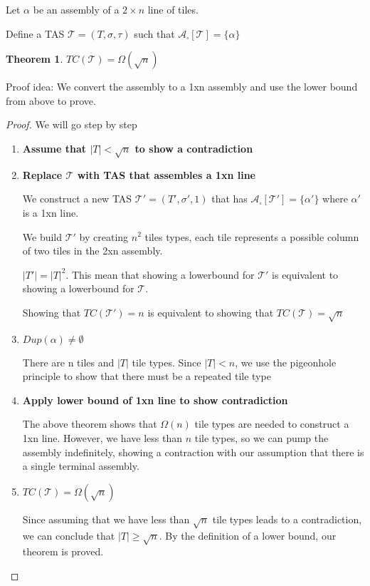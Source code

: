 \documentclass[12pt]{article}
\newtheorem{theorem}{Theorem}
\begin{document}
Let $\alpha$ be an assembly of a $2 \times n$ line of tiles.

Define a TAS $\mathcal{T} = (T, \sigma, \tau)$ such that $\mathcal{A}_\square[\mathcal{T}] = \{ \alpha \}$

\begin{theorem}
	$TC(\mathcal{T}) = \Omega(\sqrt{n})$
\end{theorem}

Proof idea: We convert the assembly to a 1xn assembly and use the lower bound from above to prove. 

\begin{proof}
		We will go step by step
	\begin{enumerate}

		\item \textbf{Assume that $|T| < \sqrt{n}$ to show a contradiction}

        \item \textbf{Replace $\mathcal{T}$ with TAS that assembles a 1xn line}

            We construct a new TAS $\mathcal{T}' = (T', \sigma', 1)$ that has $\mathcal{A}_\square[\mathcal{T}'] = \{ \alpha' \}$ where $\alpha'$ is a 1xn line.

            We build $\mathcal{T}'$ by creating $n^2$ tiles types, each tile represents a possible column of two tiles in the 2xn assembly.

            $|T'| = |T|^2$. This mean that showing a lowerbound for $\mathcal{T}'$ is equivalent to showing a lowerbound for $\mathcal{T}$.

            Showing that $TC(\mathcal{T}') = n$ is equivalent to showing that $TC(\mathcal{T}) = \sqrt{n}$


		\item \textbf{$Dup(\alpha) \neq \emptyset$}

            There are n tiles and $|T|$ tile types. Since $|T| < n$, we use the pigeonhole principle to show that there must be a repeated tile type

		\item \textbf{Apply lower bound of 1xn line to show contradiction}

            The above theorem shows that $\Omega(n)$ tile types are needed to construct a 1xn line. However, we have less than $n$ tile types, so we can pump the assembly indefinitely, showing a contraction with our assumption that there is a single terminal assembly.

		\item \textbf{$TC(\mathcal{T}) = \Omega(\sqrt{n})$}

            Since assuming that we have less than $\sqrt{n}$ tile types leads to a contradiction, we can conclude that $|T| \geq \sqrt{n}$. By the definition of a lower bound, our theorem is proved.

	\end{enumerate}
\end{proof}
\end{document}
